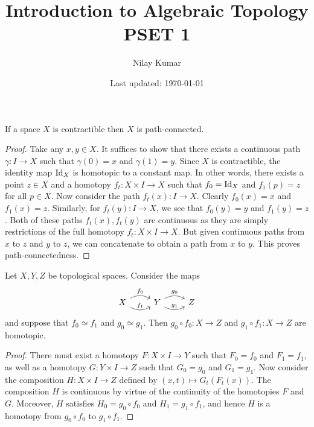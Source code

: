 \documentclass{../../mathnotes}
\title{Introduction to Algebraic Topology PSET 1}
\author{Nilay Kumar}
\date{Last updated: \today}
\begin{document}
\maketitle

\begin{prop}
    If a space $X$ is contractible then $X$ is path-connected.
\end{prop}
\begin{proof}
    Take any $x,y\in X$. It suffices to show that there exists a continuous path $\gamma:I\to X$ such that
    $\gamma(0)=x$ and $\gamma(1)=y$. Since $X$ is contractible, the identity map $\operatorname{Id}_X$ is homotopic to a
    constant map. In other words, there exists a point $z\in X$ and a homotopy $f_t:X\times I\to X$ such that
    $f_0=\operatorname{Id}_X$ and $f_1(p)=z$ for all $p\in X$. Now consider the path $f_t(x):I\to X$. Clearly $f_0(x)=x$
    and $f_1(x)=z$. Similarly, for $f_t(y):I\to X$, we see that $f_0(y)=y$ and $f_1(y)=z$. Both of these paths
    $f_t(x),f_t(y)$ are continuous as they are simply restrictions of the full homotopy $f_t:X\times I\to X$.
    But given continuous paths from $x$ to $z$ and $y$ to $z$, we can concatenate to obtain a path from
    $x$ to $y$. This proves path-connectedness.
\end{proof}

\begin{prop}
    Let $X,Y,Z$ be topological spaces. Consider the maps
    \begin{equation*}
        \begin{tikzcd}
            X\arrow[bend left]{r}{f_0}\arrow[bend right]{r}{f_1}&Y\arrow[bend left]{r}{g_0}
            \arrow[bend right]{r}{g_1}&Z
        \end{tikzcd}
    \end{equation*}
    and suppose that $f_0\simeq f_1$ and $g_0\simeq g_1$. Then $g_0\circ f_0:X\to Z$ and $g_1\circ f_1:X\to Z$
    are homotopic.
\end{prop}
\begin{proof}
    There must exist a homotopy $F:X\times I\to Y$ such that $F_0=f_0$ and $F_1=f_1$, as well as a homotopy
    $G:Y\times I\to Z$ such that $G_0=g_0$ and $G_1=g_1$. Now consider the composition $H:X\times I\to Z$
    defined by $(x,t)\mapsto G_t(F_t(x))$. The composition $H$ is continuous by virtue of the continuity
    of the homotopies $F$ and $G$.
    Moreover, $H$ satisfies $H_0=g_0\circ f_0$ and $H_1=g_1\circ f_1$, and hence $H$ is a homotopy from
    $g_0\circ f_0$ to $g_1\circ f_1$.
\end{proof}
\end{document}
